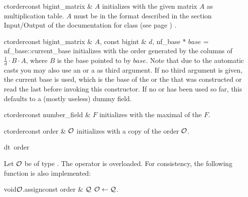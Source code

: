 \begin{fcode}{ct}{order}{const bigint_matrix & $A$}
  initializes with the given matrix $A$ as multiplication table.  $A$ must be in the format
  described in the section Input/Output of the documentation for class  (see
  page \pageref{order_io}) .
\end{fcode}

\begin{fcode}{ct}{order}{const bigint_matrix & $A$, const bigint & $d$,
    nf_base * $\mathit{base}$ = nf_base::current_base}%
  initializes with the order generated by the columns of $\frac{1}{d} \cdot B \cdot A$, where
  $B$ is the base pointed to by $\mathit{base}$.  Note that due to the automatic casts you may
  also use an  or a  as third argument.  If no third argument is
  given, the current base is used, which is the base of the  or the
   that was constructed or read the last before invoking this constructor.  If no
   or  has been used so far, this defaults to a (mostly useless)
  dummy field.
\end{fcode}

\begin{fcode}{ct}{order}{const number_field & $F$}
  initializes with the maximal  of the  $F$.
\end{fcode}

\begin{fcode}{ct}{order}{const order & $\mathcal{O}$}
  initializes with a copy of the order $\mathcal{O}$.
\end{fcode}

\begin{fcode}{dt}{~order}{}
\end{fcode}



\ASGN

Let $\mathcal{O}$ be of type .  The operator \code{=} is overloaded.  For consistency, the
following function is also implemented:

\begin{fcode}{void}{$\mathcal{O}$.assign}{const order & $\mathcal{Q}$}
  $\mathcal{O} \leftarrow \mathcal{Q}$.
\end{fcode}



\ACCS

